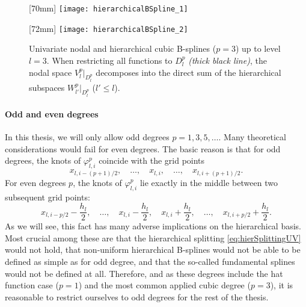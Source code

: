 \begin{figure}
  [70mm]{%
    \texttt{[image: hierarchicalBSpline\_1]}%
  }%
  \hfill%
  \hfill%
  [72mm]{%
    \texttt{[image: hierarchicalBSpline\_2]}%
  }%
  \caption{%
    Univariate nodal and hierarchical cubic B-splines ($p = 3$)
    up to level $l = 3$.
    When restricting all functions to $D_l^p$ \emph{(thick black line)},
    the nodal space $V_l^p|_{D_l^p}$ decomposes into the direct sum
    of the hierarchical subspaces $W_{l'}^p|_{D_l^p}$ ($l' \le l$).%
  }
  \label{fig:hierarchicalBSpline}
\end{figure}

\paragraph{Odd and even degrees}

In this thesis, we will only allow odd degrees $p = 1, 3, 5, \dotsc$.
Many theoretical considerations would fail for even degrees.
The basic reason is that for odd degrees, the knots of
$\varphi_{l,i}^p$ coincide with the grid points
\begin{equation}
  x_{l,i-(p+1)/2},\quad
  \dotsc,\quad
  x_{l,i},\quad
  \dotsc,\quad
  x_{l,i+(p+1)/2}.
\end{equation}
For even degrees $p$, the knots of $\varphi_{l,i}^p$ lie exactly in
the middle between two subsequent grid points:
\begin{equation}
  x_{l,i-p/2} - \frac{h_l}{2},\quad
  \dotsc,\quad
  x_{l,i} - \frac{h_l}{2},\quad
  x_{l,i} + \frac{h_l}{2},\quad
  \dotsc,\quad
  x_{l,i+p/2} + \frac{h_l}{2}.
\end{equation}
As we will see,
this fact has many adverse implications on the hierarchical basis.
Most crucial among these are
that the hierarchical splitting \eqref{eq:hierSplittingUV} would not hold,
that non-uniform hierarchical B-splines would not be able to be defined as
simple as for odd degree,
 and
that the so-called fundamental splines would not be defined at all.
Therefore, and
as these degrees include the hat function case ($p = 1$) and the
most common applied cubic degree ($p = 3$),
it is reasonable to restrict ourselves to odd degrees
for the rest of the thesis.



